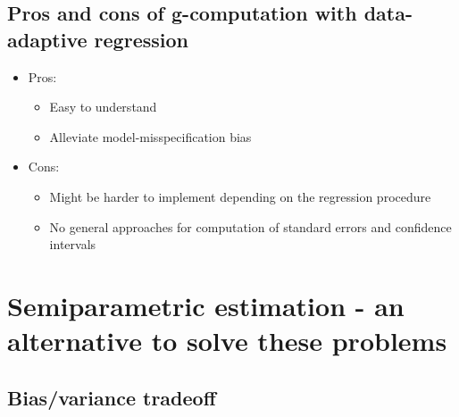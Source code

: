 \documentclass[
  12pt,
]{book}
\providecommand{\tightlist}{%
  \setlength{\itemsep}{0pt}\setlength{\parskip}{0pt}}
\theoremstyle{definition}
\theoremstyle{definition}
\theoremstyle{definition}
\newcommand{\1}{\mathbbm{1}}
\begin{document}
\hypertarget{pros-and-cons-of-g-computation-with-data-adaptive-regression}{%
\subsection{Pros and cons of g-computation with data-adaptive regression}\label{pros-and-cons-of-g-computation-with-data-adaptive-regression}}

\begin{itemize}
\tightlist
\item
  Pros:

  \begin{itemize}
  \tightlist
  \item
    Easy to understand
  \item
    Alleviate model-misspecification bias
  \end{itemize}
\item
  Cons:

  \begin{itemize}
  \tightlist
  \item
    Might be harder to implement depending on the regression procedure
  \item
    No general approaches for computation of standard errors and confidence
    intervals
  \end{itemize}
\end{itemize}

\hypertarget{semiparametric-estimation---an-alternative-to-solve-these-problems}{%
\section{Semiparametric estimation - an alternative to solve these problems}\label{semiparametric-estimation---an-alternative-to-solve-these-problems}}

\hypertarget{biasvariance-tradeoff}{%
\subsection{Bias/variance tradeoff}\label{biasvariance-tradeoff}}
\end{document}
